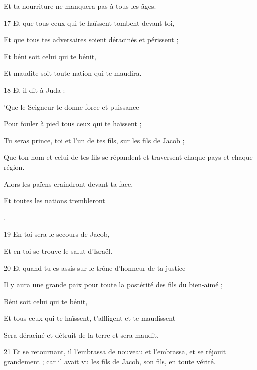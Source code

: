 \par     Et ta nourriture ne manquera pas à tous les âges.
\par    
\par 17 Et que tous ceux qui te haïssent tombent devant toi,  
\par     Et que tous tes adversaires soient déracinés et périssent ;
\par    
\par     Et béni soit celui qui te bénit,  
\par     Et maudite soit toute nation qui te maudira.
\par    
\par 18 Et il dit à Juda :  
\par     'Que le Seigneur te donne force et puissance
\par    
\par     Pour fouler à pied tous ceux qui te haïssent ;  
\par     Tu seras prince, toi et l'un de tes fils, sur les fils de Jacob ;
\par    
\par     Que ton nom et celui de tes fils se répandent et traversent chaque pays et chaque région.  
\par     Alors les païens craindront devant ta face,
\par    
\par     Et toutes les nations trembleront  
\par     [Et tous les peuples trembleront].
\par    
\par 19 En toi sera le secours de Jacob,  
\par     Et en toi se trouve le salut d’Israël.
\par    
\par 20 Et quand tu es assis sur le trône d'honneur de ta justice  
\par     Il y aura une grande paix pour toute la postérité des fils du bien-aimé ;
\par    
\par     Béni soit celui qui te bénit,  
\par     Et tous ceux qui te haïssent, t'affligent et te maudissent  
\par     Sera déraciné et détruit de la terre et sera maudit.
\par    
\par 21 Et se retournant, il l'embrassa de nouveau et l'embrassa, et se réjouit grandement ; car il avait vu les fils de Jacob, son fils, en toute vérité.

